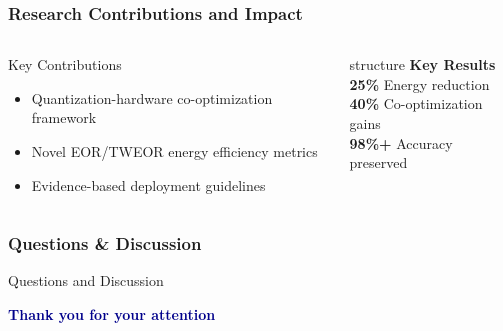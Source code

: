 \documentclass[aspectratio=169,xcolor=dvipsnames]{beamer}
\begin{document}
\begin{frame}
\frametitle{Research Contributions and Impact}

\begin{columns}[c]
\begin{exampleblock}{Key Contributions}
\begin{itemize}
\item Quantization-hardware co-optimization framework
\item Novel EOR/TWEOR energy efficiency metrics
\item Evidence-based deployment guidelines
\end{itemize}
\end{exampleblock}

\begin{center}
\begin{beamercolorbox}[wd=\textwidth,center]{structure}
\textbf{Key Results}\\
\vspace{0.2cm}
\textbf{25\%} Energy reduction\\
\textbf{40\%} Co-optimization gains\\
\textbf{98\%+} Accuracy preserved
\end{beamercolorbox}
\end{center}

\end{columns}

\vspace{1cm}
\begin{center}
\end{center}
\end{frame}

\begin{frame}
\frametitle{Questions \& Discussion}
\begin{center}
\Huge Questions and Discussion

\vspace{2cm}
\Large\textcolor{darkblue}{\textbf{Thank you for your attention}}
\end{center}
\end{frame}
\end{document}

